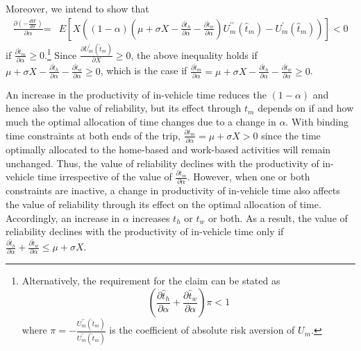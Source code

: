 \documentclass[12pt,a4paper,british]{article}
\makeatletter
\theoremstyle{definition}
\theoremstyle{plain}
\newenvironment{proof}[1][\proofname]{\par
    \normalfont\topsep6\p@\@plus6\p@\relax
    \trivlist
    \itemindent\parindent
    \item[\hskip\labelsep
          \scshape
      #1]\ignorespaces
  }{%
    \endtrivlist\@endpefalse
  }
\providecommand{\proofname}{Proof}
\theoremstyle{plain}
\makeatother
\begin{document}
\begin{proof}
Moreover, we intend to show that
\begin{align*}
\frac{\partial\left(-\frac{dW}{d\sigma}\right)}{\partial\alpha}\text{=} & E\left[X\left(\left(1-\alpha\right)\left(\mu+\sigma X-\frac{\partial\hat{t}_{h}}{\partial\alpha}-\frac{\partial\hat{t}_{w}}{\partial\alpha}\right)U_{m}^{\prime\prime}\left(\hat{t}_{m}\right)-U_{m}^{\prime}\left(\hat{t}_{m}\right)\right)\right]<0
\end{align*}
if $\frac{\partial\hat{t}_{m}}{\partial\alpha}\geq0$.\footnote{Alternatively, the requirement for the claim can be stated as%
\begin{equation*}
\left(\frac{\partial\hat{t}_{h}}{\partial\alpha}+\frac{\partial\hat{t}_{w}}{\partial\alpha}\right)\pi<1
\end{equation*}%
where $\pi=-\frac{U_{m}^{\prime\prime}\left(\hat{t}_{m}\right)}{U_{m}^{\prime}\left(\hat{t}_{m}\right)}$ is the coefficient of absolute risk aversion of $U_{m}$.} Since $\frac{\partial U_{m}^{\prime}\left(\hat{t}_{m}\right)}{\partial X}\geq0$, the above inequality holds if $\mu+\sigma X-\frac{\partial\hat{t}_{h}}{\partial\alpha}-\frac{\partial\hat{t}_{w}}{\partial\alpha}\geq0$, which is the case if $\frac{\partial\hat{t}_{m}}{\partial\alpha}=\mu+\sigma X-\frac{\partial\hat{t}_{h}}{\partial\alpha}-\frac{\partial\hat{t}_{w}}{\partial\alpha}\geq0$.
\end{proof}

An increase in the productivity of in-vehicle time reduces the $\left(1-\alpha\right)$ and hence also the value of reliability, but its effect through $t_{m}$ depends on if and how much the optimal allocation of time changes due to a change in $\alpha$. With binding time constraints at both ends of the trip, $\frac{\partial t_{m}}{\partial\alpha}=\mu+\sigma X>0$ since the time optimally allocated to the home-based and work-based activities will remain unchanged. Thus, the value of reliability declines with the productivity of in-vehicle time irrespective of the value of $\frac{\partial t_{m}}{\partial\alpha}$. However, when one or both constraints are inactive, a change in productivity of in-vehicle time also affects the value of reliability through its effect on the optimal allocation of time. Accordingly, an increase in $\alpha$ increases $t_{h}$ or $t_{w}$ or both. As a result, the value of reliability declines with the productivity of in-vehicle time only if $\frac{\partial\hat{t}_{h}}{\partial\alpha}+\frac{\partial\hat{t}_{w}}{\partial\alpha}\leq\mu+\sigma X$.

\clearpage{}
\end{document}
